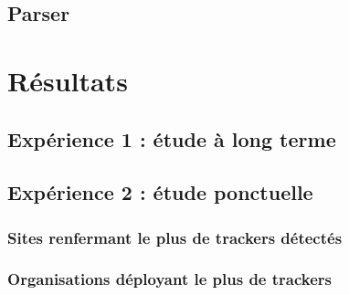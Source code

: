 \subsection{Parser}

\section{Résultats}

\subsection{Expérience 1 : étude à long terme}

\subsection{Expérience 2 : étude ponctuelle}

\subsubsection{Sites renfermant le plus de trackers détectés}

\subsubsection{Organisations déployant le plus de trackers}
